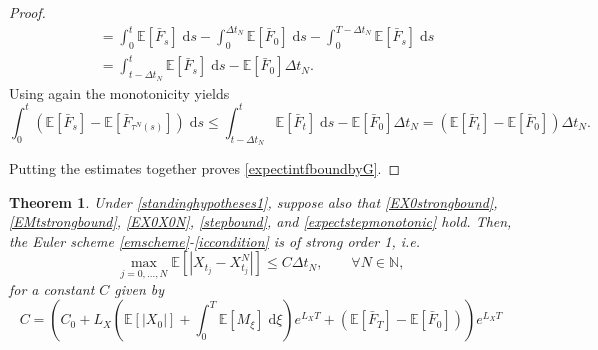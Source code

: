 \documentclass[reqno,12pt]{amsart}
\theoremstyle{plain}%
\newtheorem{thm}{Theorem}[section]
\theoremstyle{definition}
\begin{document}
\begin{proof}
\begin{align*}
        & = \int_0^t \mathbb{E}[\bar F_s] \;\mathrm{d}s - \int_0^{\Delta t_N} \mathbb{E}[\bar F_0]\;\mathrm{d}s - \int_{0}^{T-\Delta t_N} \mathbb{E}[\bar F_s]\;\mathrm{d}s \\
        & = \int_{t-\Delta t_N}^t \mathbb{E}[\bar F_s] \;\mathrm{d}s - \mathbb{E}[\bar F_0]\Delta t_N.
    \end{align*}
    Using again the monotonicity yields
    \[ 
      \int_0^t (\mathbb{E}[\bar F_s] - \mathbb{E}[\bar F_{\tau^N(s)}])\;\mathrm{d}s \leq \int_{t-\Delta t_N}^t \mathbb{E}[\bar F_t] \;\mathrm{d}s - \mathbb{E}[\bar F_0]\Delta t_N= (\mathbb{E}[\bar F_t] - \mathbb{E}[\bar F_0])\Delta t_N.
    \]

    Putting the estimates together proves \eqref{expectintfboundbyG}.
\end{proof}

\begin{thm}
    \label{thmmonotonicbound}
    Under \cref{standinghypotheses1}, suppose also that
    \eqref{EX0strongbound}, \eqref{EMtstrongbound}, \eqref{EX0X0N}, \eqref{stepbound}, and \eqref{expectstepmonotonic} hold. Then, the Euler scheme \eqref{emscheme}-\eqref{iccondition} is of strong order 1, i.e.
    \begin{equation}
      \label{thmmonotonicboundstrongordernew}
        \max_{j=0, \ldots, N}\mathbb{E}\left[ \left| X_{t_j} - X_{t_j}^N \right| \right] \leq C \Delta t_N, \qquad \forall N \in \mathbb{N},
    \end{equation}
    for a constant $C$ given by
    \begin{equation}
        \label{constmonotonicboundstrongordernew}
        C = \left(C_0 + L_X \left(\mathbb{E}[|X_0|] + \int_0^{T} \mathbb{E}[M_\xi]\;\mathrm{d}\xi\right)e^{L_X T} + (\mathbb{E}[\bar F_T] - \mathbb{E}[\bar F_0])\right)e^{L_X T}
    \end{equation}
\end{thm}
\end{document}
